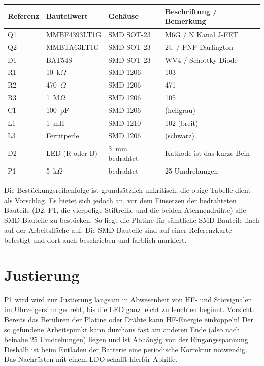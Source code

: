 \documentclass[a4paper,11pt,halfparskip,smallheadings,DIV=10]{scrartcl}
\begin{document}
\begin{center}\begin{tabular}{llll}\toprule
    \textbf{Referenz} & \textbf{Bauteilwert} & \textbf{Gehäuse} & \textbf{Beschriftung / Bemerkung}\\\midrule
Q1 & MMBF4393LT1G & SMD SOT-23 & M6G / N Kanal J-FET\\ %
Q2 & MMBTA63LT1G  & SMD SOT-23 & 2U / PNP Darlington\\ 
D1 & BAT54S       & SMD SOT-23 & WV4 / Schottky Diode\\ %
R1 & 10~k$\Omega$ & SMD 1206 & 103 \\
R2 & 470~$\Omega$ & SMD 1206 & 471 \\
R3 & 1~M$\Omega$  & SMD 1206 & 105 \\
C1 & 100~pF       & SMD 1206 & (hellgrau) \\
L1 & 1~mH         & SMD 1210   & 102 (breit) \\
L3 & Ferritperle  & SMD 1206   & (schwarz) \\\midrule
D2 & LED (R oder B)    & 3~mm bedrahtet & Kathode ist das kurze Bein\\
P1 & 5~k$\Omega$  & bedrahtet  & 25 Umdrehungen\\\bottomrule
\end{tabular}\end{center}

Die Bestückungsreihenfolge ist grundsätzlich unkritisch, die obige Tabelle
dient als Vorschlag. Es bietet sich jedoch an, vor dem Einsetzen der bedrahteten
Bauteile (D2, P1, die vierpolige Stiftreihe und die beiden Atennendrähte)
alle SMD-Bauteile zu bestücken. So liegt die Platine für sämtliche SMD Bauteile
flach auf der Arbeitsfläche auf. Die SMD-Bauteile sind auf einer Referenzkarte
befestigt und dort auch beschrieben und farblich markiert.

\section{Justierung}
P1 wird wird zur Justierung langsam in Abwesenheit von HF- und Störsignalen im
Uhrzeigersinn gedreht, bis die LED ganz leicht zu leuchten beginnt. Vorsicht:
Bereits das Berühren der Platine oder Drähte kann HF-Energie einkoppeln!
Der so gefundene Arbeitspunkt kann durchaus fast am anderen Ende (also nach
beinahe 25 Umdrehungen) liegen und ist Abhängig von der Eingangsspannung. Deshalb
ist beim Entladen der Batterie eine periodische Korrektur notwendig. Das
Nachrüsten mit einem LDO schafft hierfür Abhilfe.
\end{document}
